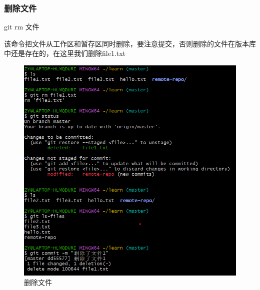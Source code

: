 \documentclass{ctexart}
\begin{document}
	\subsubsection{删除文件}
	git rm 文件 
	
	该命令把文件从工作区和暂存区同时删除，要注意提交，否则删除的文件在版本库中还是存在的，在这里我们删除file1.txt
	
	\begin{figure}[H]
		\centering
		\includegraphics[scale=0.5]{30}
		\caption{删除文件}
	\end{figure}
	
\end{document}
